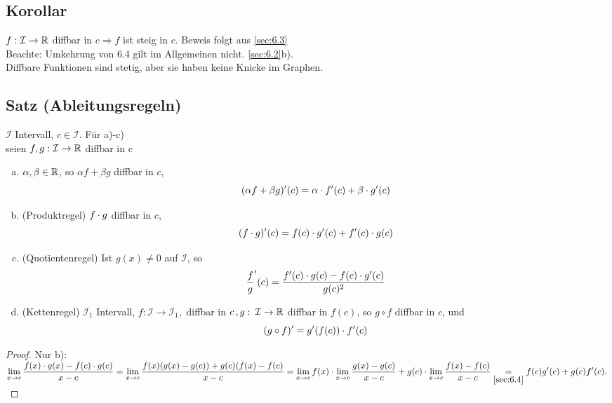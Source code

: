 \subsection{Korollar}\label{sec:6.4}
$f : \mathcal{I} \to \mathbb{R}$ diffbar in $c
\Rightarrow f$ ist steig in $c$.
Beweis folgt aus \ref{sec:6.3}\\
Beachte: Umkehrung von 6.4 gilt im Allgemeinen nicht. \ref{sec:6.2}b).\\
Diffbare Funktionen sind stetig, aber sie haben keine Knicke im Graphen.
\subsection{Satz (Ableitungsregeln)}\label{sec:6.5}
$\mathcal{I}$ Intervall, $c \in \mathcal{I}$. Für a)-c)\\
seien $f,g : \mathcal{I} \to \mathbb{R} $ diffbar in c\\
\begin{enumerate}[a)]
\item $\alpha, \beta \in \mathbb{R}$, so $\alpha f + \beta g $ diffbar in $c$,
 $$(\alpha f + \beta g)'(c) = \alpha \cdot f'(c) + \beta \cdot g'(c)$$
\item (Produktregel) $f \cdot g$ diffbar in $c$,\\
$$(f \cdot g)'(c) = f(c) \cdot g'(c) + f'(c) \cdot g(c)$$
\item (Quotientenregel) Ist $g (x) \neq 0$ auf $\mathcal{I}$, so $$\frac{f}{g}'(c) = \frac{f'(c) \cdot g(c) - f(c) \cdot g'(c)}{g(c)^2}$$
\item (Kettenregel)
$\mathcal{I}_1$ Intervall, $f: \mathcal{I} \to \mathcal{I}_1,$ diffbar in $c\, ,g:\: \mathcal{I} \to \mathbb{R}$ diffbar in $f(c)$, so $g \circ f$ diffbar in $c$, und \\
\[(g \circ f)' = g'(f(c)) \cdot f'(c) \]
\end{enumerate}
\begin{proof}
Nur b):\\
$\displaystyle \lim_{x \to c} \frac{f(x) \cdot g(x) - f(c) \cdot g(c)}{x-c} = \displaystyle \lim_{x \to c} \frac{f(x)(g(x) -g(c)) + g(c)(f(x) -f(c)}{x-c} = \displaystyle \lim_{x \to c}f(x) \cdot \displaystyle \lim_{x \to c} \frac{g(x) -g(c)}{x-c} + g(c) \cdot \displaystyle \lim_{x \to c} \frac{f(x) -f(c)}{x-c} \underset{\ref{sec:6.4}}{=}f(c) g'(c) + g(c) f'(c).$\\
\end{proof}
